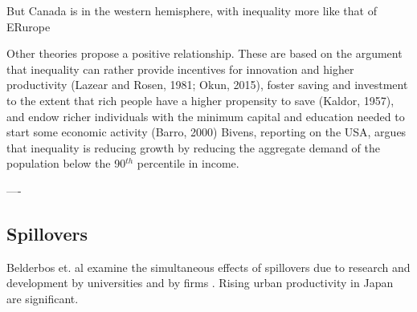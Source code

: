  But Canada is in the western hemisphere, with inequality more like that of ERurope 
 
 Other theories propose a positive relationship. These are based on the argument that inequality can rather provide incentives for innovation and higher productivity (Lazear and Rosen, 1981; Okun, 2015), foster saving and investment to the extent that rich people have a higher propensity to save (Kaldor, 1957), and endow richer individuals with the minimum capital and education needed to start some economic activity (Barro, 2000)
Bivens, reporting on the USA, argues that inequality is reducing growth by reducing the aggregate demand of the population below the 90$^{th}$ percentile in income.\cite{bivensInequalitySlowingUS2017} 



----





\subsection{Spillovers}
Belderbos et. al examine the simultaneous effects of spillovers due to research and development by universities and by firms \cite{belderbosWhatSpilloversUniversities2022}. Rising urban productivity in Japan are significant. 






